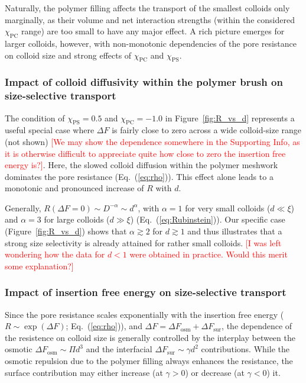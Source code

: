 \documentclass[12pt, a4paper]{article}
\newcommand\todo[1]{\textcolor{red}{#1}}
\begin{document}
Naturally, the polymer filling affects the transport of the smallest colloids only marginally, as their volume and net interaction strengths (within the considered $\chi_{\text{PC}}$ range) are too small to have any major effect. A rich picture emerges for larger colloids, however, with non-monotonic dependencies of the pore resistance on colloid size and strong effects of $\chi_{\text{PC}}$ and $\chi_{\text{PS}}$. 


\subsubsection{Impact of colloid diffusivity within the polymer brush on size-selective transport}

The condition of $\chi_{\text{PS}}=0.5$ and $\chi_{\text{PC}} = -1.0$ in Figure~\ref{fig:R_vs_d} represents a useful special case where $\Delta F$ is fairly close to zero across a wide colloid-size range (not shown)
\todo{[We may show the dependence somewhere in the Supporting Info, as it is otherwise difficult to appreciate quite how close to zero the insertion free energy is?]}.
Here, the slowed colloid diffusion within the polymer meshwork dominates the pore resistance (Eq.~(\ref{eq:rho})). This effect alone leads to a monotonic and pronounced increase of $R$ with $d$.

Generally, $R(\Delta F=0) \sim D^{-\alpha} \sim d^{\alpha}$, with $\alpha = 1$ for very small colloids ($d \ll \xi$) and $\alpha = 3$ for large colloids ($d \gg \xi$) (Eq.~(\ref{eq:Rubinstein})).
Our specific case (Figure~\ref{fig:R_vs_d}) shows that $\alpha \gtrsim 2$ for $d \gtrsim  1$ and thus illustrates that a strong size selectivity is already attained for rather small colloids.
\todo{[I was left wondering how the data for $d < 1$ were obtained in practice. Would this merit some explanation?]}


\subsubsection{Impact of insertion free energy on size-selective transport}

Since the pore resistance scales exponentially with the insertion free energy ($R \sim \exp (\Delta F)$; Eq.~(\ref{eq:rho})), and $\Delta F =\Delta F_{\text{osm}} + \Delta F_{\text{sur}}$, the dependence of the resistence on colloid size is generally controlled by the interplay between
the osmotic $\Delta F_{\text{osm}} \sim \Pi d^3$ and the interfacial $\Delta F_{\text{sur}} \sim \gamma d^2$ contributions. 
While the osmotic repulsion due to the polymer filling always enhances the resistance, the surface contribution may either increase (at $\gamma > 0$) or decrease (at $\gamma<0$) it.
\end{document}
